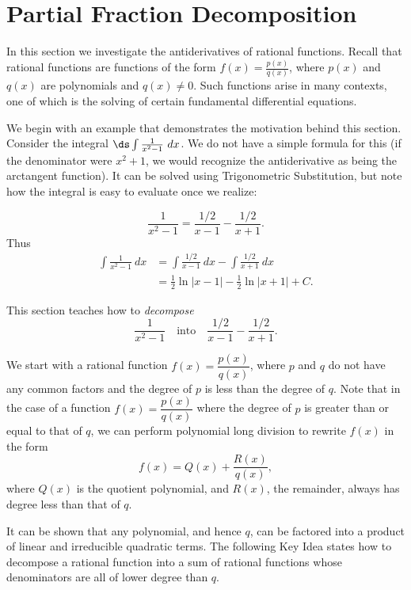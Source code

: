 \section{Partial Fraction Decomposition}\label{sec:partial_fraction}

In this section we investigate the antiderivatives of rational functions. Recall that rational functions are functions of the form $f(x)= \frac{p(x)}{q(x)}$, where $p(x)$ and $q(x)$ are polynomials and $q(x)\neq 0$. Such functions arise in many contexts, one of which is the solving of certain fundamental differential equations.

We begin with an example that demonstrates the motivation behind this section. Consider the integral $\ds\int \frac{1}{x^2-1}\ dx$. We do not have a simple formula for this (if the denominator were $x^2+1$, we would recognize the antiderivative as being the arctangent function). It can be solved using Trigonometric Substitution, but note how the integral is easy to evaluate once we realize:

\[
\frac{1}{x^2-1} = \frac{1/2}{x-1} - \frac{1/2}{x+1}.
\]
Thus 
\begin{align*}
\int\frac{1}{x^2-1}\ dx &= \int\frac{1/2}{x-1}\ dx - \int\frac{1/2}{x+1}\ dx \\
			&= \frac12\ln|x-1| - \frac12\ln|x+1| + C.
\end{align*}

This section teaches how to \textit{decompose} 
\[
\frac{1}{x^2-1}\quad  \text{into}\quad  \frac{1/2}{x-1}-\frac{1/2}{x+1}.
\]

We start with a rational function $f(x)=\dfrac{p(x)}{q(x)}$, where $p$ and $q$ do not have any common factors and the degree of $p$ is less than the degree of $q$. Note that in the case of a function $f(x) = \dfrac{p(x)}{q(x)}$ where the degree of $p$ is greater than or equal to that of $q$, we can perform polynomial long division to rewrite $f(x)$ in the form
\[
f(x) = Q(x)+\frac{R(x)}{q(x)},
\]
where $Q(x)$ is the quotient polynomial, and $R(x)$, the remainder, always has degree less than that of $q$. 

It can be shown that any polynomial, and hence $q$, can be factored into a product of linear and irreducible quadratic terms. The following Key Idea states how to decompose a rational function into a sum of rational functions whose denominators are all of lower degree than $q$.


